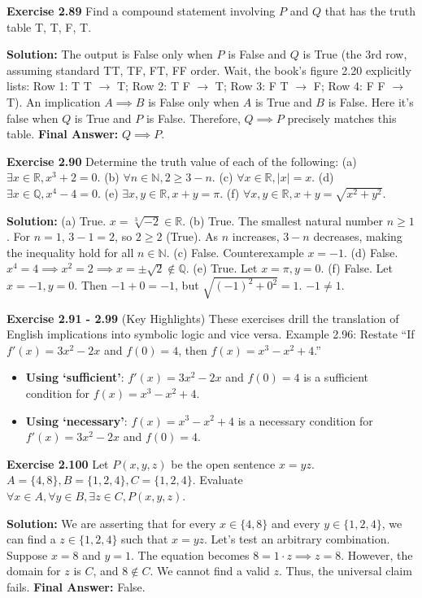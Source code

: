 \documentclass[12pt]{article}
\begin{document}
\textbf{Exercise 2.89}
Find a compound statement involving $P$ and $Q$ that has the truth table T, T, F, T.
\begin{mdframed}
\textbf{Solution:}
The output is False only when $P$ is False and $Q$ is True (the 3rd row, assuming standard TT, TF, FT, FF order. Wait, the book's figure 2.20 explicitly lists: 
Row 1: T T $\to$ T; 
Row 2: T F $\to$ T; 
Row 3: F T $\to$ F; 
Row 4: F F $\to$ T).
An implication $A \implies B$ is False only when $A$ is True and $B$ is False. Here it's false when $Q$ is True and $P$ is False. 
Therefore, $Q \implies P$ precisely matches this table.
\textbf{Final Answer:} $Q \implies P$.
\end{mdframed}

\textbf{Exercise 2.90}
Determine the truth value of each of the following:
(a) $\exists x \in \mathbb{R}, x^3 + 2 = 0$.
(b) $\forall n \in \mathbb{N}, 2 \ge 3 - n$.
(c) $\forall x \in \mathbb{R}, |x| = x$.
(d) $\exists x \in \mathbb{Q}, x^4 - 4 = 0$.
(e) $\exists x, y \in \mathbb{R}, x + y = \pi$.
(f) $\forall x, y \in \mathbb{R}, x + y = \sqrt{x^2 + y^2}$.
\begin{mdframed}
\textbf{Solution:}
(a) True. $x = \sqrt[3]{-2} \in \mathbb{R}$.
(b) True. The smallest natural number $n \ge 1$. For $n=1$, $3-1 = 2$, so $2 \ge 2$ (True). As $n$ increases, $3-n$ decreases, making the inequality hold for all $n \in \mathbb{N}$.
(c) False. Counterexample $x = -1$.
(d) False. $x^4 = 4 \implies x^2 = 2 \implies x = \pm\sqrt{2} \notin \mathbb{Q}$.
(e) True. Let $x = \pi, y = 0$.
(f) False. Let $x = -1, y = 0$. Then $-1 + 0 = -1$, but $\sqrt{(-1)^2 + 0^2} = 1$. $-1 \neq 1$.
\end{mdframed}

\textbf{Exercise 2.91 - 2.99} (Key Highlights)
These exercises drill the translation of English implications into symbolic logic and vice versa.
Example 2.96: Restate ``If $f'(x) = 3x^2 - 2x$ and $f(0) = 4$, then $f(x) = x^3 - x^2 + 4$.''
\begin{itemize}
    \item \textbf{Using `sufficient'}: $f'(x) = 3x^2 - 2x$ and $f(0) = 4$ is a sufficient condition for $f(x) = x^3 - x^2 + 4$.
    \item \textbf{Using `necessary'}: $f(x) = x^3 - x^2 + 4$ is a necessary condition for $f'(x) = 3x^2 - 2x$ and $f(0) = 4$.
\end{itemize}

\textbf{Exercise 2.100}
Let $P(x,y,z)$ be the open sentence $x = yz$. 
$A = \{4,8\}, B = \{1,2,4\}, C = \{1,2,4\}$. Evaluate $\forall x \in A, \forall y \in B, \exists z \in C, P(x,y,z)$.
\begin{mdframed}
\textbf{Solution:}
We are asserting that for every $x \in \{4,8\}$ and every $y \in \{1,2,4\}$, we can find a $z \in \{1,2,4\}$ such that $x = yz$.
Let's test an arbitrary combination. Suppose $x = 8$ and $y = 1$. 
The equation becomes $8 = 1 \cdot z \implies z = 8$.
However, the domain for $z$ is $C$, and $8 \notin C$. We cannot find a valid $z$. Thus, the universal claim fails.
\textbf{Final Answer:} False.
\end{mdframed}
\end{document}
